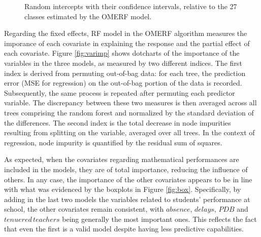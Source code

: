 \begin{figure}[H]
{    }
    \caption[]{Random intercepts with their confidence intervals, relative to the 27 classes estimated by the OMERF model.}
    \label{fig:reff}
\end{figure}

Regarding the fixed effects, RF model in the OMERF algorithm measures the imporance of each covariate in explaining the response and the partial effect of each covariate.
Figure \ref{fig:varimp} shows dotcharts of the importance of the variables in the three models, as measured by two different indices.
The first index is derived from permuting out-of-bag data: for each tree, the prediction error (MSE for regression) on the out-of-bag portion of the data is recorded. Subsequently, the same process is repeated after permuting each predictor variable. The discrepancy between these two measures is then averaged across all trees comprising the random forest and normalized by the standard deviation of the differences.
The second index is the total decrease in node impurities resulting from splitting on the variable, averaged over all trees. In the context of regression, node impurity is quantified by the residual sum of squares.

As expected, when the covariates regarding mathematical performances are included in the models, they are of total importance, reducing the influence of others. In any case, the importance of the other covariates appears to be in line with what was evidenced by the boxplots in Figure \ref{fig:box}.
Specifically, by adding in the last two models the variables related to students' performance at school, the other covariates remain consistent, with \(absence\), \(delays\), \(PDB\) and \(tenuered \, teachers\) being generally the most important ones. This reflects the fact that even the first is a valid model despite having less predictive capabilities.

